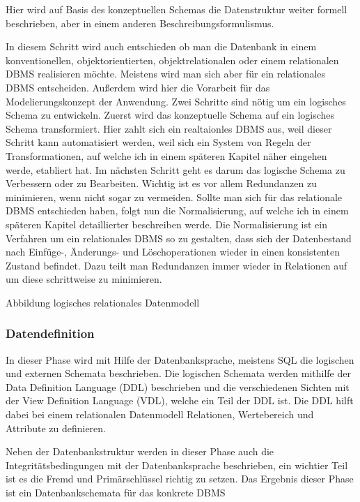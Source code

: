 \begin{flushleft}
Hier wird auf Basis des konzeptuellen Schemas die Datenstruktur weiter formell beschrieben, aber in einem anderen Beschreibungsformulismus.


In diesem Schritt wird auch entschieden ob man die Datenbank in einem konventionellen, objektorientierten, objektrelationalen oder einem relationalen DBMS realisieren möchte. Meistens wird man sich aber für ein relationales DBMS entscheiden. Außerdem wird hier die Vorarbeit für das Modelierungskonzept der Anwendung. 
Zwei Schritte sind nötig um ein logisches Schema zu entwickeln. Zuerst wird das konzeptuelle Schema auf ein logisches Schema transformiert. Hier zahlt sich ein realtaionles DBMS aus, weil dieser Schritt kann automatisiert werden, weil sich ein System von Regeln der Transformationen, auf welche ich in einem späteren Kapitel näher eingehen werde, etabliert hat. Im nächsten Schritt geht es darum das logische Schema zu Verbessern oder zu Bearbeiten. Wichtig ist es vor allem Redundanzen zu minimieren, wenn nicht sogar zu vermeiden. Sollte man sich für das relationale DBMS entschieden haben, folgt nun die Normalisierung, auf welche ich in einem späteren Kapitel detaillierter beschreiben werde. Die Normalisierung ist ein Verfahren um ein relationales DBMS so zu gestalten, dass sich der Datenbestand nach Einfüge-, Änderungs- und Löschoperationen wieder in einen konsistenten Zustand befindet. Dazu teilt man Redundanzen immer wieder in Relationen auf um diese schrittweise zu minimieren.

Abbildung logisches relationales Datenmodell

\subsubsection{Datendefinition}

In dieser Phase wird mit Hilfe der Datenbanksprache, meistens SQL die logischen und externen Schemata beschrieben. Die logischen Schemata werden mithilfe der Data Definition Language (DDL) beschrieben und die verschiedenen Sichten mit der View Definition Language (VDL), welche ein Teil der DDL ist.  Die DDL hilft dabei bei einem relationalen Datenmodell Relationen, Wertebereich und Attribute zu definieren.

Neben der Datenbankstruktur werden in dieser Phase auch die Integritätsbedingungen mit der Datenbanksprache beschrieben, ein wichtier Teil ist es die Fremd und Primärschlüssel richtig zu setzen. Das Ergebnis dieser Phase ist ein Datenbankschemata für das konkrete DBMS


\end{flushleft}
